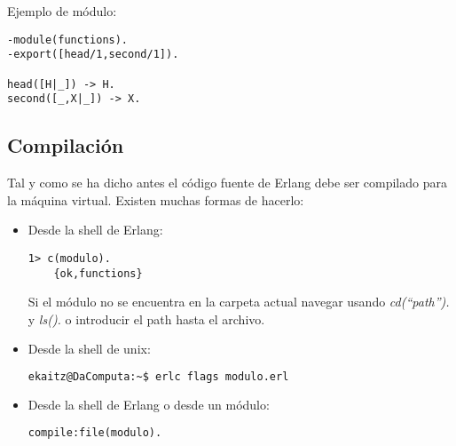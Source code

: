 Ejemplo de módulo:
\begin{lstlisting}
-module(functions).
-export([head/1,second/1]).

head([H|_]) -> H.
second([_,X|_]) -> X.
\end{lstlisting}

\subsection{Compilación}

Tal y como se ha dicho antes el código fuente de Erlang debe ser compilado para la máquina virtual. Existen
muchas formas de hacerlo:
\begin{itemize}
  \item Desde la shell de Erlang:
    \begin{lstlisting}[gobble=4]
    1> c(modulo).
    {ok,functions}
    \end{lstlisting}
    Si el módulo no se encuentra en la carpeta actual navegar usando \textit{cd(``path'').} y \textit{ls().} o
    introducir el path hasta el archivo.

  \item Desde la shell de unix:
    \begin{lstlisting}[language=bash,gobble=4]
    ekaitz@DaComputa:~$ erlc flags modulo.erl
    \end{lstlisting}

  \item Desde la shell de Erlang o desde un módulo:
    \begin{lstlisting}[gobble=4]
    compile:file(modulo).
    \end{lstlisting}
\end{itemize}




